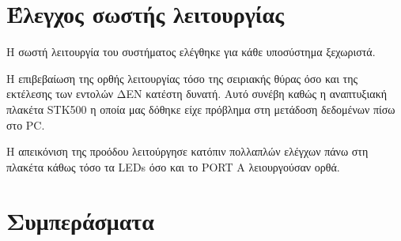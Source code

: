 \documentclass[a4paper,12pt]{article}
\begin{document}
\section{Έλεγχος σωστής λειτουργίας}
Η σωστή λειτουργία του συστήματος ελέγθηκε για κάθε υποσύστημα ξεχωριστά. 

Η επιβεβαίωση της ορθής λειτουργίας τόσο της σειριακής θύρας όσο και της εκτέλεσης των εντολών ΔΕΝ κατέστη δυνατή. Αυτό συνέβη καθώς η αναπτυξιακή πλακέτα STK500 η οποία μας δόθηκε είχε πρόβλημα στη μετάδοση δεδομένων πίσω στο PC.

Η απεικόνιση της προόδου λειτούργησε κατόπιν πολλαπλών ελέγχων πάνω στη πλακέτα κάθως τόσο τα LEDs όσο και το PORT A λειουργούσαν ορθά.  



\section{Συμπεράσματα}
\end{document}
